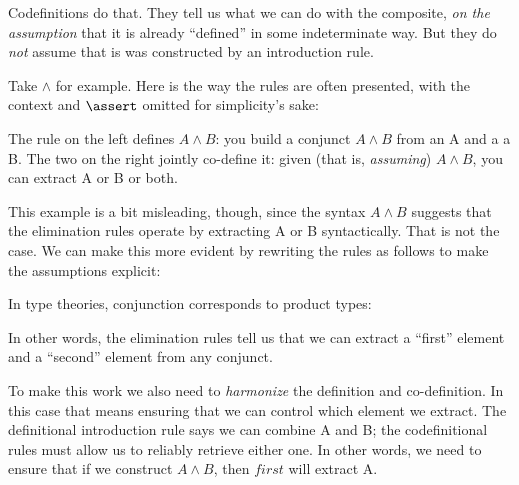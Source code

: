 \documentclass{article}
\begin{document}
Codefinitions do that. They tell us what we can do with the composite,
\textit{on the assumption} that it is already ``defined'' in some
indeterminate way. But they do \textit{not} assume that is was
constructed by an introduction rule.

Take \(\land\) for example. Here is the way the rules are often
presented, with the context and \(\linfer\) omitted for simplicity's
sake:


The rule on the left defines \(A\land B\): you build a conjunct
\(A\land B\) from an A and a a B. The two on the right jointly
co-define it: given (that is, \textit{assuming}) \(A\land B\), you
can extract A or B or both.

This example is a bit misleading, though, since the syntax \(A\land
B\) suggests that the elimination rules operate by extracting A or B
syntactically. That is not the case. We can make this more evident by
rewriting the rules as follows to make the assumptions explicit:


In type theories, conjunction corresponds to product types:


In other words, the elimination rules tell us that we can extract a ``first'' element and a ``second'' element from any conjunct.

To make this work we also need to \textit{harmonize} the definition
and co-definition. In this case that means ensuring that we can
control which element we extract. The definitional introduction rule
says we can combine A and B; the codefinitional rules must allow us to
reliably retrieve either one. In other words, we need to ensure that
if we construct \(A\land B\), then \(first\) will extract A.
\end{document}
